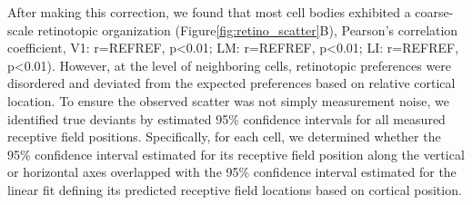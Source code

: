 After making this correction, we found that most cell bodies exhibited a coarse-scale retinotopic organization (Figure\ref{fig:retino_scatter}B), Pearson's correlation coefficient, V1: r=REFREF, p<0.01; LM: r=REFREF, p<0.01; LI: r=REFREF, p<0.01). However, at the level of neighboring cells, retinotopic preferences were disordered and deviated from the expected preferences based on relative cortical location. To ensure the observed scatter was not simply measurement noise, we identified true deviants by estimated 95\% confidence intervals for all measured receptive field positions. Specifically, for each cell, we determined whether the 95\% confidence interval estimated for its receptive field position along the vertical or horizontal axes overlapped with the 95\% confidence interval estimated for the linear fit defining its predicted receptive field locations based on cortical position.  

